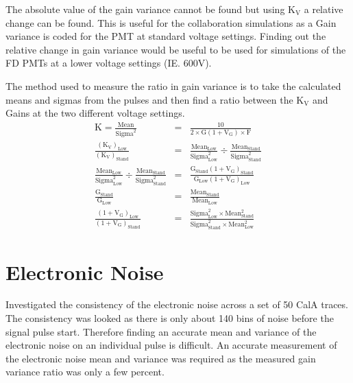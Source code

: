 The absolute value of the gain variance cannot be found but using K$_{\mathrm{V}}$ a relative change can be found. This is useful for the collaboration simulations as a Gain variance is coded for the PMT at standard voltage settings. Finding out the relative change in gain variance would be useful to be used for simulations of the FD PMTs at a lower voltage settings (IE. 600V).

The method used to measure the ratio in gain variance is to take the calculated means and sigmas from the pulses and then find a ratio between the K$_{\mathrm{V}}$ and Gains at the two different voltage settings.
\begin{eqnarray}
\mathrm{K} = \frac{\mathrm{Mean}}{\mathrm{Sigma}^2} &=& \frac{10}{2 \times \mathrm{G} (1 + \mathrm{V}_{\mathrm{G}}) \times \mathrm{F}} \\ 
\frac{\left(\mathrm{K}_{\mathrm{V}}\right)_{\mathrm{Low}}}{\left(\mathrm{K}_{\mathrm{V}}\right)_{\mathrm{Stand}}} &=& \frac{\mathrm{Mean}_{\mathrm{Low}}}{\mathrm{Sigma}^2_{\mathrm{Low}}} \div \frac{\mathrm{Mean}_{\mathrm{Stand}}}{\mathrm{Sigma}^2_{\mathrm{Stand}}} \\ 
\frac{\mathrm{Mean}_{\mathrm{Low}}}{\mathrm{Sigma}^2_{\mathrm{Low}}} \div \frac{\mathrm{Mean}_{\mathrm{Stand}}}{\mathrm{Sigma}^2_{\mathrm{Stand}}} &=& \frac{\mathrm{G}_{\mathrm{Stand}} (1 + \mathrm{V}_{\mathrm{G}})_{\mathrm{Stand}}}{\mathrm{G}_{\mathrm{Low}} (1 + \mathrm{V}_{\mathrm{G}})_{\mathrm{Low}}} \\
\frac{\mathrm{G}_{\mathrm{Stand}}}{\mathrm{G}_{\mathrm{Low}}} &=& \frac{\mathrm{Mean}_{\mathrm{Stand}}}{\mathrm{Mean}_{\mathrm{Low}}} \\
\frac{(1 + \mathrm{V}_{\mathrm{G}})_{\mathrm{Low}}}{(1 + \mathrm{V}_{\mathrm{G}})_{\mathrm{Stand}}} &=& \frac{\mathrm{Sigma}^2_{\mathrm{Low}} \times \mathrm{Mean}^2_{\mathrm{Stand}}}{\mathrm{Sigma}^2_{\mathrm{Stand}} \times \mathrm{Mean}^2_{\mathrm{Low}}}
\end{eqnarray}

\section{Electronic Noise}

Investigated the consistency of the electronic noise across a set of 50 CalA traces. The consistency was looked as there is only about 140 bins of noise before the signal pulse start. Therefore finding an accurate mean and variance of the electronic noise on an individual pulse is difficult. An accurate measurement of the electronic noise mean and variance was required as the measured gain variance ratio was only a few percent.

